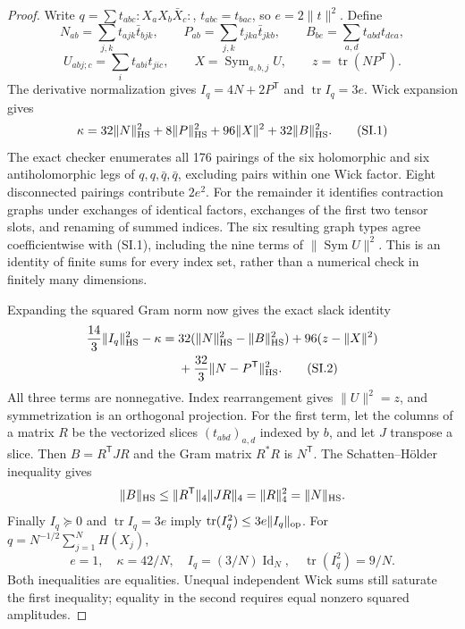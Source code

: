 \begin{proof}
Write $q=\sum t_{abc}{:}X_aX_b\bar X_c{:}$, $t_{abc}=t_{bac}$,
so $e=2\|t\|^2$. Define
\[
 N_{ab}=\sum_{j,k}t_{ajk}\bar t_{bjk},\qquad
 P_{ab}=\sum_{j,k}t_{jka}\bar t_{jkb},\qquad
 B_{be}=\sum_{a,d}t_{abd}t_{dea},
\]
\[
 U_{abj;c}=\sum_i t_{abi}t_{jic},\qquad
 X=\operatorname{Sym}_{a,b,j}U,\qquad z=\operatorname{tr}(NP^{\mathsf T}).
\]
The derivative normalization gives $I_q=4N+2P^{\mathsf T}$ and
$\operatorname{tr}I_q=3e$. Wick expansion gives
\[
 \kappa=32\|N\|_{\rm HS}^2+8\|P\|_{\rm HS}^2
                    +96\|X\|^2+32\|B\|_{\rm HS}^2.             \tag{SI.1}
\]
The exact checker enumerates all 176 pairings of the six holomorphic
and six antiholomorphic legs of $q,q,\bar q,\bar q$, excluding pairs
within one Wick factor. Eight disconnected pairings contribute $2e^2$.
For the remainder it identifies contraction graphs under exchanges of
identical factors, exchanges of the first two tensor slots, and renaming
of summed indices. The six resulting graph types agree coefficientwise
with (SI.1), including the nine terms of $\|\operatorname{Sym}U\|^2$.
This is an identity of finite sums for every index set, rather than a
numerical check in finitely many dimensions.

Expanding the squared Gram norm now gives the exact slack identity
\begin{align*}
 \frac{14}{3}\|I_q\|_{\rm HS}^2-\kappa
 ={}&32(\|N\|_{\rm HS}^2-\|B\|_{\rm HS}^2)
       +96(z-\|X\|^2)\\
    &+\frac{32}{3}\|N-P^{\mathsf T}\|_{\rm HS}^2.                \tag{SI.2}
\end{align*}
All three terms are nonnegative. Index rearrangement gives
$\|U\|^2=z$, and symmetrization is an orthogonal projection.
For the first term, let the columns of a matrix $R$ be the vectorized
slices $(t_{abd})_{a,d}$ indexed by $b$, and let $J$ transpose a slice.
Then $B=R^{\mathsf T}JR$ and the Gram matrix $R^*R$ is $N^{\mathsf T}$.
The Schatten--H\"older inequality gives
\[
 \|B\|_{
\rm HS}\le\|R^{\mathsf T}\|_4\|JR\|_4
 =\|R\|_4^2=\|N\|_{\rm HS}.
\]
Finally $I_q\succeq0$ and $\operatorname{tr}I_q=3e$ imply
$\operatorname{tr}(I_q^2)\le3e\|I_q\|_{\rm op}$.
For $q=N^{-1/2}\sum_{j=1}^NH(X_j)$,
\[
 e=1,\quad\kappa=42/N,\quad I_q=(3/N)\operatorname{Id}_N,
 \quad\operatorname{tr}(I_q^2)=9/N.
\]
Both inequalities are equalities. Unequal independent Wick sums still
saturate the first inequality; equality in the second requires equal
nonzero squared amplitudes.
\end{proof}

